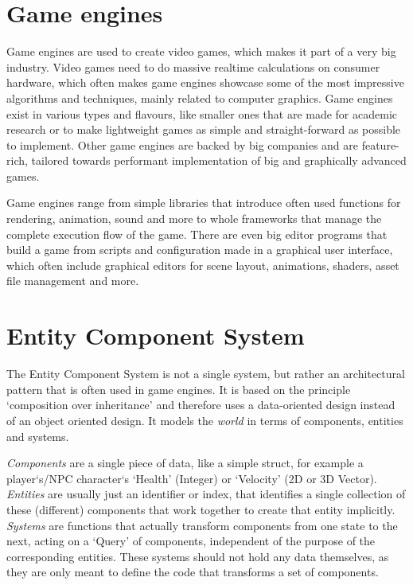 \label{chap:introduction}

\section{Game engines}

Game engines are used to create video games, which makes it part of a very big industry. Video games need to do massive realtime calculations on consumer hardware, which often makes game engines showcase some of the most impressive algorithms and techniques, mainly related to computer graphics. Game engines exist in various types and flavours, like smaller ones that are made for academic research or to make lightweight games as simple and straight-forward as possible to implement. Other game engines are backed by big companies and are feature-rich, tailored towards performant implementation of big and graphically advanced games.

Game engines range from simple libraries that introduce often used functions for rendering, animation, sound and more to whole frameworks that manage the complete execution flow of the game. There are even big editor programs that build a game from scripts and configuration made in a graphical user interface, which often include graphical editors for scene layout, animations, shaders, asset file management and more.

\section{Entity Component System}

The Entity Component System is not a single system, but rather an architectural pattern that is often used in game engines. It is based on the principle `composition over inheritance' and therefore uses a data-oriented design instead of an object oriented design. It models the \textit{world} in terms of components, entities and systems.

\textit{Components} are a single piece of data, like a simple struct, for example a player`s/NPC character`s `Health' (Integer) or `Velocity' (2D or 3D Vector). \textit{Entities} are usually just an identifier or index, that identifies a single collection of these (different) components that work together to create that entity implicitly. \textit{Systems} are functions that actually transform components from one state to the next, acting on a `Query' of components, independent of the purpose of the corresponding entities. These systems should not hold any data themselves, as they are only meant to define the code that transforms a set of components.

